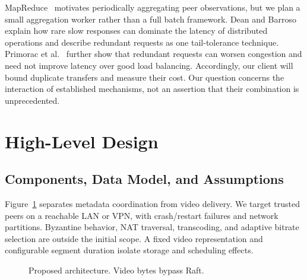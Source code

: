 \documentclass[letterpaper,twocolumn,10pt]{article}
\begin{document}
MapReduce~\cite{dean2004mapreduce} motivates periodically aggregating peer
observations, but we plan a small aggregation worker rather than a full batch
framework. Dean and Barroso~\cite{dean2013tail} explain how rare slow
responses can dominate the latency of distributed operations and describe
redundant requests as one tail-tolerance technique. Primorac et
al.~\cite{primorac2021hedge} further show that redundant requests can worsen
congestion and need not improve latency over good load balancing.
Accordingly, our client will bound duplicate transfers and measure their
cost. Our question concerns the interaction of established mechanisms, not
an assertion that their combination is unprecedented.

\section{High-Level Design}
\subsection{Components, Data Model, and Assumptions}
Figure~\ref{fig:architecture} separates metadata coordination from video delivery. We target trusted peers on a reachable LAN or VPN, with crash/restart failures and network partitions. Byzantine behavior, NAT traversal, transcoding, and adaptive bitrate selection are outside the initial scope. A fixed video representation and configurable segment duration isolate storage and scheduling effects.

\begin{figure}[t]
\centering
{}
\caption{Proposed architecture. Video bytes bypass Raft.}
\label{fig:architecture}
\end{figure}
\end{document}
